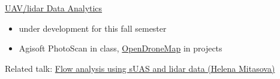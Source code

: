 \documentclass[xcolor={dvipsnames,usenames},beamer,aspectratio=169]{beamer}
\begin{document}
\begin{frame}{\coursesTitle}


\begin{block}{\href{http://ncsu-osgeorel.github.io/uav-lidar-analytics-course/}%
  {UAV/lidar Data Analytics}}
\begin{itemize}
 \item under development for this fall semester
 \item Agisoft PhotoScan in class, \href{http://opendronemap.org/}{OpenDroneMap} in projects
\end{itemize}

Related talk: \href{http://europe.foss4g.org/2015/Program}%
                 {Flow analysis using sUAS and lidar data (Helena Mitasova)}

\end{block}

\begin{columns}[c]


\end{columns}
\end{frame}
\end{document}
